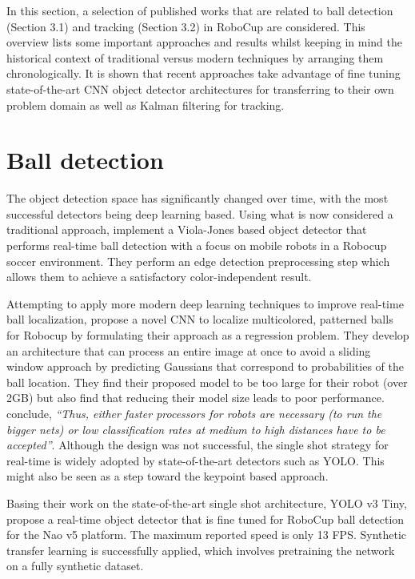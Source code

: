 \documentclass[a4paper,twoside,12pt]{report}
\begin{document}
In this section, a selection of published works that are related to ball detection  (Section 3.1) and tracking (Section 3.2) in RoboCup are considered. This overview lists some important approaches and results whilst keeping in mind the historical context of traditional versus modern techniques by arranging them chronologically. It is shown that recent approaches take advantage of fine tuning state-of-the-art CNN object detector architectures for transferring to their own problem domain as well as Kalman filtering for tracking.

\section{Ball detection}
\label{section:balldetection}

The object detection space has significantly changed over time, with the most successful detectors being deep learning based. Using what is now considered a traditional approach, \cite{robovj} implement a Viola-Jones based object detector that performs real-time ball detection with a focus on mobile robots in a Robocup soccer environment. They perform an edge detection preprocessing step which allows them to achieve a satisfactory color-independent result.

Attempting to apply more modern deep learning techniques to improve real-time ball localization, \cite{selfcnn} propose a novel CNN to localize multicolored, patterned balls for Robocup by formulating their approach as a regression problem. They develop an architecture that can process an entire image at once to avoid a sliding window approach by predicting Gaussians that correspond to probabilities of the ball location. They find their proposed model to be too large for their robot (over 2GB) but also find that reducing their model size leads to poor performance. \cite{selfcnn} conclude, \textit{``Thus, either faster processors for robots are necessary (to run the bigger nets) or low classification rates at medium to high distances have to be accepted''}. Although the design was not successful, the single shot strategy for real-time is widely adopted by state-of-the-art detectors such as YOLO. This might also be seen as a step toward the keypoint based approach.

Basing their work on the state-of-the-art single shot architecture, YOLO v3 Tiny, \cite{robo} propose a real-time object detector that is fine tuned for RoboCup ball detection for the Nao v5 platform. The maximum reported speed is only 13 FPS. Synthetic transfer learning is successfully applied, which involves pretraining the network on a fully synthetic dataset. 
\end{document}
